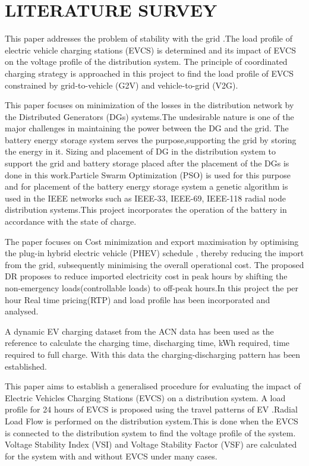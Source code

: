 \chapter{LITERATURE SURVEY}
	\label{chap:LR}
	
	\cite{base} This paper addresses the problem of stability with the grid .The load profile of electric vehicle charging stations (EVCS) is determined  and its impact of EVCS on the voltage profile of the distribution system. The principle of coordinated charging strategy is approached in this project to find the load profile of EVCS constrained by grid-to-vehicle (G2V) and vehicle-to-grid (V2G). 
	
	\cite{soc} This paper focuses on minimization of the losses in the distribution network by  the Distributed Generators (DGs) systems.The undesirable nature is one of the major challenges in maintaining the power between the DG and the grid. The battery energy storage system serves the purpose,supporting the grid by storing the energy in it. Sizing and placement of DG in the distribution system to support the grid and  battery storage placed after the placement of the DGs is done in this work.Particle Swarm Optimization (PSO) is used for this purpose and for placement of the battery energy storage system a genetic algorithm is used in the IEEE networks such as IEEE-33, IEEE-69, IEEE-118 radial node distribution systems.This project incorporates  the operation of the battery in accordance with the state of charge. 
	
	\cite{rtp} The paper focuses on Cost minimization and export maximisation  by optimising  the plug-in hybrid electric vehicle (PHEV) schedule , thereby reducing the import from the grid, subsequently minimising the overall operational cost. The proposed DR proposes to  reduce imported electricity cost in peak hours by shifting the non-emergency loads(controllable loads) to off-peak hours.In this project the per hour Real time pricing(RTP) and load profile has been incorporated and analysed.
	
	\cite{evdata} A dynamic EV charging dataset from the ACN data has been used as the reference to calculate the charging time, discharging time, kWh required, time required to full charge. With this data the charging-discharging pattern has been established. 
	
	\cite{33bus} This paper aims to establish a generalised procedure for evaluating the impact of Electric Vehicles Charging Stations (EVCS) on a distribution system. A load profile for 24 hours of EVCS is proposed using the travel patterns of EV .Radial Load Flow is performed on the distribution system.This is done when the EVCS is connected to the distribution system to find the voltage profile of the system. Voltage Stability Index (VSI) and Voltage Stability Factor (VSF) are calculated for the system with and without EVCS under many cases.
	
